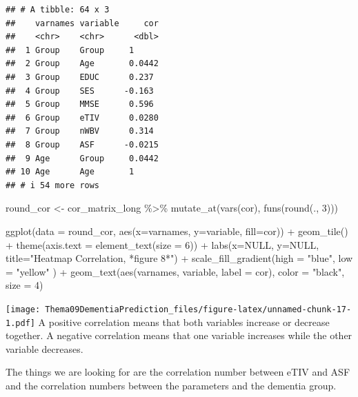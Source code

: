 \documentclass[
]{article}
\newenvironment{Shaded}{\begin{snugshade}}{\end{snugshade}}
\newcommand{\AttributeTok}[1]{\textcolor[rgb]{0.77,0.63,0.00}{#1}}
\newcommand{\ConstantTok}[1]{\textcolor[rgb]{0.00,0.00,0.00}{#1}}
\newcommand{\DecValTok}[1]{\textcolor[rgb]{0.00,0.00,0.81}{#1}}
\newcommand{\FunctionTok}[1]{\textcolor[rgb]{0.00,0.00,0.00}{#1}}
\newcommand{\NormalTok}[1]{#1}
\newcommand{\OtherTok}[1]{\textcolor[rgb]{0.56,0.35,0.01}{#1}}
\newcommand{\SpecialCharTok}[1]{\textcolor[rgb]{0.00,0.00,0.00}{#1}}
\newcommand{\StringTok}[1]{\textcolor[rgb]{0.31,0.60,0.02}{#1}}
\begin{document}
\begin{verbatim}
## # A tibble: 64 x 3
##    varnames variable     cor
##    <chr>    <chr>      <dbl>
##  1 Group    Group     1     
##  2 Group    Age       0.0442
##  3 Group    EDUC      0.237 
##  4 Group    SES      -0.163 
##  5 Group    MMSE      0.596 
##  6 Group    eTIV      0.0280
##  7 Group    nWBV      0.314 
##  8 Group    ASF      -0.0215
##  9 Age      Group     0.0442
## 10 Age      Age       1     
## # i 54 more rows
\end{verbatim}

\begin{Shaded}
\begin{Highlighting}[]
\NormalTok{round\_cor }\OtherTok{\textless{}{-}}\NormalTok{ cor\_matrix\_long }\SpecialCharTok{\%\textgreater{}\%} \FunctionTok{mutate\_at}\NormalTok{(}\FunctionTok{vars}\NormalTok{(cor), }\FunctionTok{funs}\NormalTok{(}\FunctionTok{round}\NormalTok{(., }\DecValTok{3}\NormalTok{)))}


\FunctionTok{ggplot}\NormalTok{(}\AttributeTok{data =}\NormalTok{ round\_cor, }\FunctionTok{aes}\NormalTok{(}\AttributeTok{x=}\NormalTok{varnames, }\AttributeTok{y=}\NormalTok{variable, }\AttributeTok{fill=}\NormalTok{cor)) }\SpecialCharTok{+}
\FunctionTok{geom\_tile}\NormalTok{() }\SpecialCharTok{+}
\FunctionTok{theme}\NormalTok{(}\AttributeTok{axis.text =} \FunctionTok{element\_text}\NormalTok{(}\AttributeTok{size =} \DecValTok{6}\NormalTok{)) }\SpecialCharTok{+}
\FunctionTok{labs}\NormalTok{(}\AttributeTok{x=}\ConstantTok{NULL}\NormalTok{, }\AttributeTok{y=}\ConstantTok{NULL}\NormalTok{, }\AttributeTok{title=}\StringTok{"Heatmap Correlation, *figure 8*"}\NormalTok{) }\SpecialCharTok{+}
\FunctionTok{scale\_fill\_gradient}\NormalTok{(}\AttributeTok{high =} \StringTok{"blue"}\NormalTok{, }\AttributeTok{low =} \StringTok{"yellow"}\NormalTok{ ) }\SpecialCharTok{+}
  \FunctionTok{geom\_text}\NormalTok{(}\FunctionTok{aes}\NormalTok{(varnames, variable, }\AttributeTok{label =}\NormalTok{ cor), }\AttributeTok{color =} \StringTok{"black"}\NormalTok{, }\AttributeTok{size =} \DecValTok{4}\NormalTok{)}
\end{Highlighting}
\end{Shaded}

\texttt{[image: Thema09DementiaPrediction\_files/figure-latex/unnamed-chunk-17-1.pdf]}
A positive correlation means that both variables increase or decrease
together. A negative correlation means that one variable increases while
the other variable decreases.

The things we are looking for are the correlation number between eTIV
and ASF and the correlation numbers between the parameters and the
dementia group.
\end{document}
